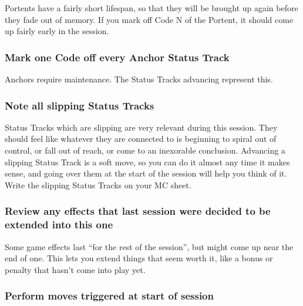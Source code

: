 \documentclass[
  oneside,
  statementpaper,
  9pt]{memoir}
\begin{document}
Portents have a fairly short lifespan, so that they will be brought up
again before they fade out of memory. If you mark off Code N of the
Portent, it should come up fairly early in the session.

\hypertarget{mark-one-code-off-every-anchor-status-track}{%
\subsubsection{Mark one Code off every Anchor Status
Track}\label{mark-one-code-off-every-anchor-status-track}}

Anchors require maintenance. The Status Tracks advancing represent this.

\hypertarget{note-all-slipping-status-tracks}{%
\subsubsection{Note all slipping Status
Tracks}\label{note-all-slipping-status-tracks}}

Status Tracks which are slipping are very relevant during this session.
They should feel like whatever they are connected to is beginning to
spiral out of control, or fall out of reach, or come to an inexorable
conclusion. Advancing a slipping Status Track is a soft move, so you can
do it almost any time it makes sense, and going over them at the start
of the session will help you think of it. Write the slipping Status
Tracks on your MC sheet.

\hypertarget{review-any-effects-that-last-session-were-decided-to-be-extended-into-this-one}{%
\subsubsection{Review any effects that last session were decided to be
extended into this
one}\label{review-any-effects-that-last-session-were-decided-to-be-extended-into-this-one}}

Some game effects last ``for the rest of the session'', but might come
up near the end of one. This lets you extend things that seem worth it,
like a bonus or penalty that hasn't come into play yet.

\hypertarget{perform-moves-triggered-at-start-of-session}{%
\subsubsection{Perform moves triggered at start of
session}\label{perform-moves-triggered-at-start-of-session}}
\end{document}

